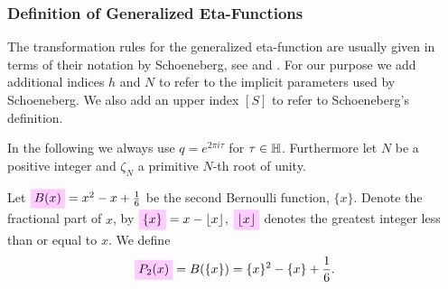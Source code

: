 \documentclass{article}
\begin{document}
\subsubsection{Definition of Generalized Eta-Functions}

\begin{Hemmecke}
  The transformation rules for the generalized eta-function are
  usually given in terms of their notation by Schoeneberg, see
  \cite[Chp.~VIII]{Schoeneberg:EllipticModularFunctions:1974} and
  \cite{Chen+Du+Zhao:FindingModularFunctionsRamanujan:2019}. For our
  purpose we add additional indices $h$ and $N$ to refer to the
  implicit parameters used by Schoeneberg. We also add an upper index
  $[S]$ to refer to Schoeneberg's definition.
\end{Hemmecke}

In the following we always use $q = e^{2\pi i \tau}$ for $\tau \in
\mathbb{H}$.
%
Furthermore let $N$ be a positive integer and $\zeta_N$ a primitive
$N$-th root of unity.

Let $\defineNotation[B]{B(x)} = x^2 - x + \frac{1}{6}$
be the second Bernoulli function, $\{x\}$.
%
Denote the fractional part of $x$, by
$\defineNotation[x-fractional]{\{x\}} = x - \lfloor x \rfloor$,
$\defineNotation[x-floor]{\lfloor x \rfloor}$ denotes the greatest
integer less than or equal to $x$.
We define
\begin{gather}
    \defineNotation[P-2]{P_2(x)} = B(\{x\}) = \{x\}^2 - \{x\} + \frac{1}{6}.
\end{gather}
\end{document}
